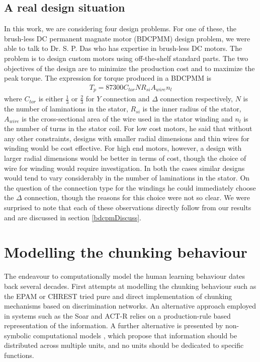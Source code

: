 \subsection{A real design situation}
\label{expertInAction}
In this work, we are considering four design problems. For one of these,
the brush-less DC permanent magnate motor (BDCPMM) design problem, we were
able to talk to Dr. S. P. Das who has expertise in brush-less DC motors. The
problem is to design custom motors using off-the-shelf standard parts. The
two objectives of the design are to minimize the production cost and to
maximize the peak torque. The expression for torque produced in a BDCPMM is
\begin{align}
T_p = 87300 C_{tor} N R_{si} A_{wire} n_{l} 
\end{align}
where $C_{tor}$ is either $\frac{1}{3}$ or $\frac{2}{3}$ for $Y$ connection
and $\Delta$ connection respectively, $N$ is the number of laminations in
the stator, $R_{si}$ is the inner radius of the stator, $A_{wire}$ is the
cross-sectional area of the wire used in the stator winding and $n_l$ is
the number of turns in the stator coil.  For low cost motors, he said that
without any other constraints, designs with smaller radial dimensions and
thin wires for winding would be cost effective. For high end motors,
however, a design with larger radial dimensions would be better in terms of
cost, though the choice of wire for winding would require investigation.
In both the cases similar designs would tend to vary considerably in the
number of laminations in the stator. On the question of the connection
type for the windings he could immediately choose the $\Delta$ connection,
though the reasons for this choice were not so clear. We were surprised to
note that each of these observations directly follow from our results and
are discussed in section \ref{bdcpmDiscuss}.




\section{Modelling the chunking behaviour}
The endeavour to computationally model the human learning behaviour dates
back several decades. First attempts at modelling the chunking behaviour
such as the EPAM or CHREST \citep{feigen61, gobet93} tried pure and direct
implementation of chunking mechanisms based on discrimination networks. An
alternative approach employed in systems such as the Soar and ACT-R
\citep{anderson96} relies on a production-rule based representation of the
information. A further alternative is presented by non-symbolic
computational models \citep{elman05}, which propose that information should
be distributed across multiple units, and no units should be dedicated to
specific functions.

